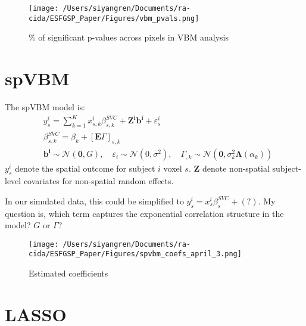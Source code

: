 \documentclass[12pt]{article}
\begin{document}
\begin{figure}[ht]
    \centering
    \texttt{[image: /Users/siyangren/Documents/ra-cida/ESFGSP\_Paper/Figures/vbm\_pvals.png]}
    \caption{\% of significant p-values across pixels in VBM analysis}
    \label{fig:vbm_pvals}
\end{figure}



\section*{spVBM}

The spVBM model is:
\[
    \begin{aligned}
         & y_s^i=\sum_{k=1}^K x_{s, k}^i \beta_{s, k}^{S V C}+\mathbf{Z}^{\mathbf{i}} \mathbf{b}^{\mathbf{i}}+\varepsilon_s^i                                                                                                                      \\
         & \beta_{s, k}^{S V C}=\beta_k+[\mathbf{E} \Gamma]_{s, k}                                                                                                                                                                                 \\
         & \mathbf{b}^{\mathbf{i}} \sim \mathcal{N}(\mathbf{0}, G), \quad \varepsilon_i \sim \mathcal{N}\left(0, \sigma^2\right), \quad \Gamma_{, k} \sim \mathcal{N}\left(\mathbf{0}, \sigma_k^2 \boldsymbol{\Lambda}\left(\alpha_k\right)\right)
    \end{aligned}
\]
\(y_s^i\) denote the spatial outcome for subject \(i\) voxel \(s\). \(\mathbf{Z}\) denote non-spatial subject-level covariates for non-spatial random effects.

In our simulated data, this could be simplified to \(y_s^i = x_s^i \beta_s^{SVC} + (?) \). My question is, which term captures the exponential correlation structure in the model? \(G\) or \(\Gamma\)?

\begin{figure}[H]
    \centering
    \texttt{[image: /Users/siyangren/Documents/ra-cida/ESFGSP\_Paper/Figures/spvbm\_coefs\_april\_3.png]}
    \caption{Estimated coefficients}
    \label{fig:my_label}
\end{figure}

\section*{LASSO}
\end{document}
